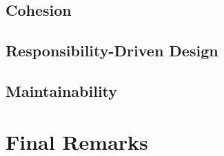 \documentclass[12pt, a4paper]{scrartcl}
\begin{document}
\begin{multicols}{2}
\subsection{Cohesion}

\subsection{Responsibility-Driven Design}

\subsection{Maintainability}

\section{Final Remarks}

\end{multicols}
\end{document}
